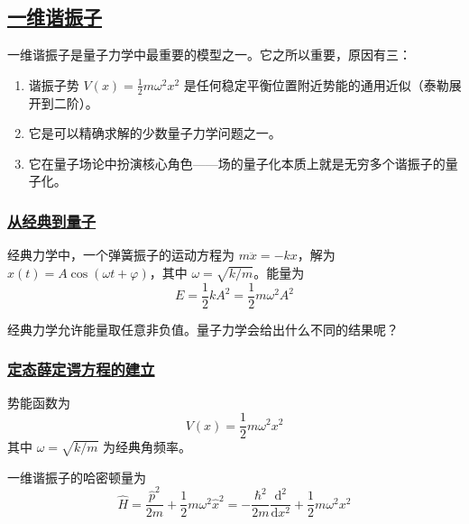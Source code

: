 \subsection{\protect\hyperlink{:}{一维谐振子}}

一维谐振子是量子力学中最重要的模型之一。它之所以重要，原因有三：
\begin{enumerate}
    \item 谐振子势 $V(x) = \frac{1}{2}m\omega^2 x^2$ 是任何稳定平衡位置附近势能的通用近似（泰勒展开到二阶）。
    \item 它是可以精确求解的少数量子力学问题之一。
    \item 它在量子场论中扮演核心角色——场的量子化本质上就是无穷多个谐振子的量子化。
\end{enumerate}

\subsubsection{\protect\hyperlink{:}{从经典到量子}}

经典力学中，一个弹簧振子的运动方程为 $m\ddot{x} = -kx$，解为 $x(t) = A\cos(\omega t + \varphi)$，其中 $\omega = \sqrt{k/m}$。能量为
\begin{equation}
    E = \frac{1}{2}kA^2 = \frac{1}{2}m\omega^2 A^2
\end{equation}

经典力学允许能量取任意非负值。量子力学会给出什么不同的结果呢？

\subsubsection{\protect\hyperlink{:}{定态薛定谔方程的建立}}
%

\begin{definition}[一维谐振子]
    势能函数为
    \begin{equation}
        V(x) = \frac{1}{2}m\omega^2 x^2
    \end{equation}
    其中 $\omega = \sqrt{k/m}$ 为经典角频率。
\end{definition}

一维谐振子的哈密顿量为
\begin{equation}
    \hat{H} = \frac{\hat{p}^2}{2m} + \frac{1}{2}m\omega^2\hat{x}^2 = -\frac{\hbar^2}{2m}\frac{\mathrm{d}^2}{\mathrm{d}x^2} + \frac{1}{2}m\omega^2 x^2
\end{equation}

